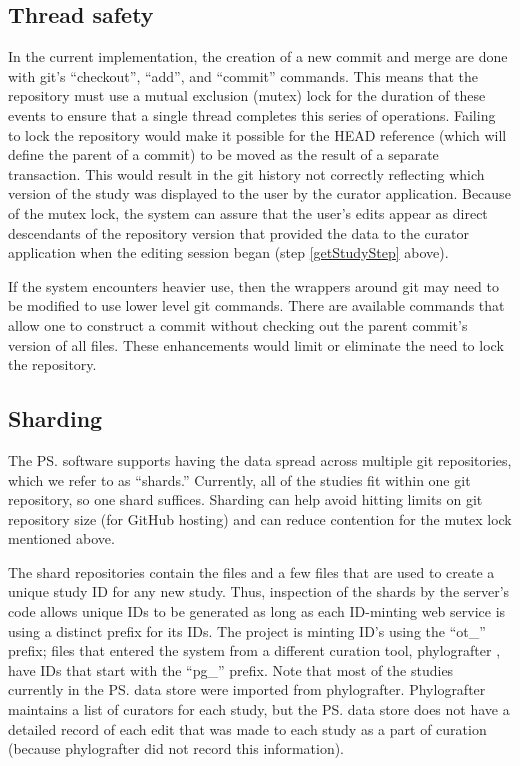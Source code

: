 \begin{methods}
\subsection*{Thread safety}
In the current implementation, the creation of a new commit and merge are done with git's ``checkout'', ``add'', and ``commit'' commands.
This means that the repository must use a mutual exclusion (mutex) lock for the duration of these events
    to ensure that a single thread completes this series of operations.
Failing to lock the repository would make it possible for the HEAD reference (which
    will define the parent of a commit) to be moved as the result of a separate transaction.
This would result in the git history not correctly reflecting which version of the 
    study was displayed to the user by the curator application.
Because of the mutex lock, the system can assure that the user's edits appear
    as direct descendants of the repository version that provided the data to 
    the curator application when the editing session began (step \ref{getStudyStep} above).

If the system encounters heavier use, then the wrappers around git may need to 
    be modified to use lower level git commands.
There are available commands that allow one to construct a commit without checking out
    the parent commit's version of all files.
These enhancements would limit or eliminate the need to lock the repository.
\subsection*{Sharding}
The \ps software supports having the data spread across multiple git repositories, which
    we refer to as ``shards.''
Currently, all of the studies fit within one git repository, so one shard suffices.
Sharding can help avoid hitting limits on git repository size (for GitHub hosting) and can 
    reduce contention for the mutex lock mentioned above.

The shard repositories contain the \nexson files and a few files that are used to 
    create a unique study ID for any new study.
Thus, inspection of the shards by the server's code allows unique IDs to be generated as long as 
    each ID-minting web service is using a distinct prefix for its IDs.
The \otol project is minting ID's using the ``ot\_'' prefix;
    files that entered the system from a different curation tool, phylografter \citep{Phylografter},
    have IDs that start with the ``pg\_'' prefix. 
Note that most of the studies currently in the \ps data store were imported from phylografter.
Phylografter maintains a list of curators for each study, but the \ps data store does not
    have a detailed record of each edit that was made to each study as a part of 
    curation (because phylografter did not record this information).


\end{methods}
